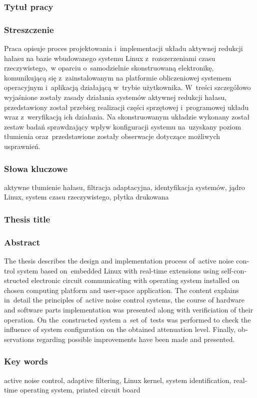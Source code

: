 \subsubsection*{Tytuł pracy} 
\Title

\subsubsection*{Streszczenie}

Praca opisuje proces projektowania i~implementacji układu aktywnej redukcji
hałasu na bazie wbudowanego systemu Linux z~rozszerzeniami czasu
rzeczywistego,~w oparciu o~samodzielnie skonstruowaną elektronikę, komunikującą
się z~zainstalowanym na platformie obliczeniowej systemem operacyjnym
i~aplikacją działającą w~trybie użytkownika. W~treści szczegółowo wyjaśnione
zostały zasady działania systemów aktywnej redukcji hałasu, przedstawiony został
przebieg realizacji części sprzętowej i~programowej układu wraz z~weryfikacją
ich działania. Na skonstruowanym układzie wykonany został zestaw badań
sprawdzający wpływ konfiguracji systemu na~uzyskany poziom tłumienia
oraz~przedstawione zostały obserwacje dotyczące możliwych usprawnień.

\subsubsection*{Słowa kluczowe} 
aktywne tłumienie hałasu, filtracja adaptacyjna, identyfikacja systemów, jądro
Linux, system czasu rzeczywistego, płytka drukowana 

\subsubsection*{Thesis title} 
\begin{otherlanguage}{british}
\TitleAlt
\end{otherlanguage}

\subsubsection*{Abstract} 
\begin{otherlanguage}{british}

The thesis describes the design and implementation process of~active noise
control system based on~embedded Linux with real-time extensions using
self-constructed electronic circuit communicating with operating system
installed on chosen computing platform and user-space application. The content
explains in~detail the principles of~active noise control systems, the course of
hardware and software parts implementation was presented along with
verificiation of their operation. On the~constructed system a~set of~tests was
performed to check the influence of system configuration on the obtained
attenuation level. Finally, observations regarding possible improvements have
been made and presented. 

\end{otherlanguage}
\subsubsection*{Key words}  
\begin{otherlanguage}{british}
active noise control, adaptive filtering, Linux kernel, system identification,
real-time operating system, printed circuit board
\end{otherlanguage}

